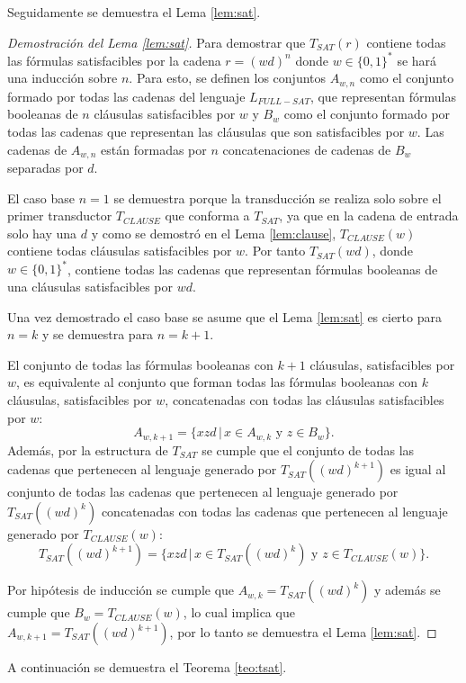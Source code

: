Seguidamente se demuestra el Lema \ref{lem:sat}. 

\begin{proof}[Demostración del Lema \ref{lem:sat}]
    Para demostrar que $T_{SAT}(r)$ contiene todas las fórmulas satisfacibles por la cadena $r=(wd)^n$ donde 
    $w\in\{0,1\}^*$ se hará una inducción sobre $n$. Para esto, se definen los conjuntos $A_{w,n}$ como el 
    conjunto formado por todas las cadenas del lenguaje $L_{FULL-SAT}$, que representan fórmulas booleanas de 
    $n$ cláusulas satisfacibles por $w$ y $B_w$ como el conjunto formado por todas las cadenas que representan 
    las cláusulas que son satisfacibles por $w$. Las cadenas de $A_{w,n}$ están formadas por $n$ concatenaciones
    de cadenas de $B_w$ separadas por $d$.
    
    El caso base $n=1$ se demuestra porque la transducción se realiza solo sobre el primer transductor 
    $T_{CLAUSE}$ que conforma a $T_{SAT}$, ya que en la cadena de entrada solo hay una $d$ y como se demostró 
    en el Lema \ref{lem:clause}, $T_{CLAUSE}(w)$ contiene todas cláusulas satisfacibles por $w$. Por tanto
    $T_{SAT}(wd)$, donde $w\in \{0,1\}^*$, contiene todas las cadenas que representan fórmulas booleanas
    de una cláusulas satisfacibles por $wd$.
    
    Una vez demostrado el caso base se asume que el Lema \ref{lem:sat} es cierto para $n=k$ y se demuestra 
    para $n=k+1$. 
    
    El conjunto de todas las fórmulas booleanas con $k+1$ cláusulas, satisfacibles por $w$, es equivalente al conjunto 
    que forman todas las fórmulas booleanas con $k$ cláusulas, satisfacibles por $w$,  concatenadas con todas las 
    cláusulas satisfacibles por $w$: $$A_{w,k+1}=\{xzd\,|\,x\in A_{w,k} \text{ y } z\in B_w\}.$$  Además, por la estructura 
    de $T_{SAT}$ se cumple que el conjunto de todas las cadenas que pertenecen al lenguaje generado por $T_{SAT}((wd)^{k+1})$
    es igual al conjunto de todas las cadenas que pertenecen al lenguaje generado por $T_{SAT}((wd)^{k})$
    concatenadas con todas las cadenas que pertenecen al lenguaje generado por $T_{CLAUSE}(w)$:
    $$T_{SAT}((wd)^{k+1})=\{xzd\,|\,x\in T_{SAT}((wd)^{k}) \text{ y } z\in T_{CLAUSE}(w)\}.$$
    
    Por hipótesis de inducción se cumple que $A_{w,k}=T_{SAT}((wd)^{k})$ y además se cumple que $B_w=T_{CLAUSE}(w)$, lo cual implica que $A_{w,k+1}=T_{SAT}((wd)^{k+1})$, por lo tanto se demuestra el Lema \ref{lem:sat}.
    
\end{proof}
A continuación se demuestra el Teorema \ref{teo:tsat}.

